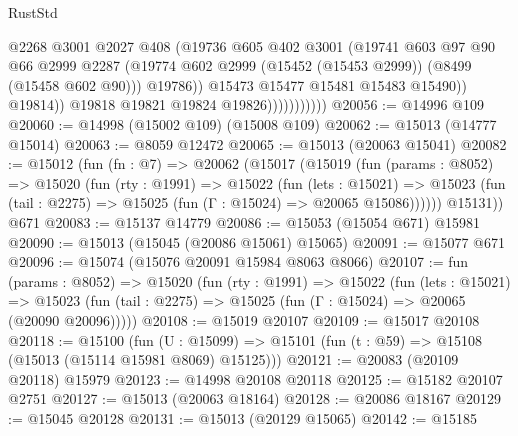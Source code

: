 \begin{lexlean}{RustStd}
\begin{coremodule}
                                  @2268
                                  @3001
                                  @2027
                                  @408
                                  (@19736
                                    @605
                                    @402
                                    @3001
                                    (@19741
                                      @603
                                      @97
                                      @90
                                      @66
                                      @2999
                                      @2287
                                      (@19774
                                        @602
                                        @2999
                                        (@15452 (@15453 @2999))
                                        (@8499 (@15458 @602 @90)))
                                      @19786))
                                  @15473
                                  @15477
                                  @15481
                                  @15483
                                  @15490))
                              @19814))
                          @19818
                          @19821
                          @19824
                          @19826)))))))))))
@20056 := @14996 @109
@20060 := @14998 (@15002 @109) (@15008 @109)
@20062 := @15013 (@14777 @15014)
@20063 := @8059 @12472
@20065 := @15013 (@20063 @15041)
@20082 := @15012
    (fun (fn : @7) =>
    @20062
      (@15017
        (@15019
          (fun (params : @8052) =>
          @15020
            (fun (rty : @1991) =>
            @15022
              (fun (lets : @15021) =>
              @15023 (fun (tail : @2275) => @15025 (fun (Γ : @15024) => @20065 @15086))))))
        @15131))
    @671
@20083 := @15137 @14779
@20086 := @15053 (@15054 @671) @15981
@20090 := @15013 (@15045 (@20086 @15061) @15065)
@20091 := @15077 @671
@20096 := @15074 (@15076 @20091 @15984 @8063 @8066)
@20107 := fun (params : @8052) =>
  @15020
    (fun (rty : @1991) =>
    @15022
      (fun (lets : @15021) =>
      @15023 (fun (tail : @2275) => @15025 (fun (Γ : @15024) => @20065 (@20090 @20096)))))
@20108 := @15019 @20107
@20109 := @15017 @20108
@20118 := @15100
    (fun (U : @15099) => @15101 (fun (t : @59) => @15108 (@15013 (@15114 @15981 @8069) @15125)))
@20121 := @20083 (@20109 @20118) @15979
@20123 := @14998 @20108 @20118
@20125 := @15182 @20107 @2751
@20127 := @15013 (@20063 @18164)
@20128 := @20086 @18167
@20129 := @15045 @20128
@20131 := @15013 (@20129 @15065)
@20142 := @15185

\end{coremodule}
\end{lexlean}
